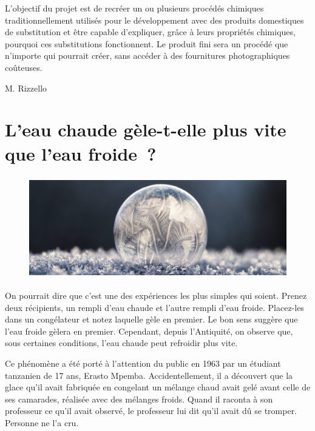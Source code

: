 \documentclass[
  10pt,
  french,
  a5paper,
  openany]{book}
\newenvironment{signature}{\begin{flushright}}{\end{flushright}}
\begin{document}
L'objectif du projet est de recréer un ou plusieurs procédés chimiques traditionnellement utilisés pour le développement avec des produits domestiques de substitution et être capable d'expliquer, grâce à leurs propriétés chimiques, pourquoi ces substitutions fonctionnent. Le produit fini sera un procédé que n'importe qui pourrait créer, sans accéder à des fournitures photographiques coûteuses.

\begin{signature}
M. Rizzello

\end{signature}

\hypertarget{leau-chaude-guxe8le-t-elle-plus-vite-que-leau-froide}{%
\chapter{L'eau chaude gèle-t-elle plus vite que l'eau froide~?}\label{leau-chaude-guxe8le-t-elle-plus-vite-que-leau-froide}}

\begin{figure}

{\centering \includegraphics[height=12em]{images/eau-chaude} 

}

\end{figure}

On pourrait dire que c'est une des expériences les plus simples qui soient. Prenez deux récipients, un rempli d'eau chaude et l'autre rempli d'eau froide. Placez-les dans un congélateur et notez laquelle gèle en premier. Le bon sens suggère que l'eau froide gèlera en premier. Cependant, depuis l'Antiquité, on observe que, sous certaines conditions, l'eau chaude peut refroidir plus vite.

Ce phénomène a été porté à l'attention du public en 1963 par un étudiant tanzanien de 17 ans, Erasto Mpemba. Accidentellement, il a découvert que la glace qu'il avait fabriquée en congelant un mélange chaud avait gelé avant celle de ses camarades, réalisée avec des mélanges froids. Quand il raconta à son professeur ce qu'il avait observé, le professeur lui dit qu'il avait dû se tromper. Personne ne l'a cru.
\end{document}
